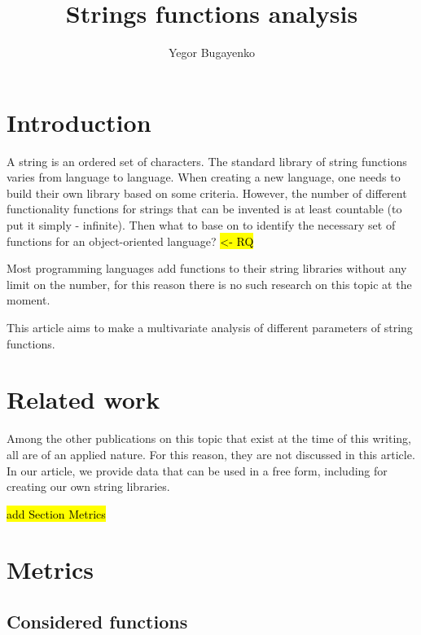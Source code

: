 \documentclass[anonymous,sigplan,review,11pt,nonacm,natbib=false]{acmart}
\title{Strings functions analysis}
\author{Yegor Bugayenko}
\affiliation{Huawei\city{Moscow}\country{Russia}}
\begin{document}
    \raggedbottom

    \begin{abstract}
    \end{abstract}

    \maketitle

    \section{Introduction}\label{sec:intro}

    A string is an ordered set of characters. The standard library of string functions varies from language to language. When creating a new language, one needs to build their own library based on some criteria. However, the number of different functionality functions for strings that can be invented is at least countable (to put it simply - infinite). Then what to base on to identify the necessary set of functions for an object-oriented language? \hl{<- RQ}

    Most programming languages add functions to their string libraries without any limit on the number, for this reason there is no such research on this topic at the moment.

    This article aims to make a multivariate analysis of different parameters of string functions.

    \section{Related work}

    Among the other publications on this topic that exist at the time of this writing, all are of an applied nature. For this reason, they are not discussed in this article. In our article, we provide data that can be used in a free form, including for creating our own string libraries.

    \hl{add Section Metrics}

    \section{Metrics}

    \subsection{Considered functions}
\end{document}
